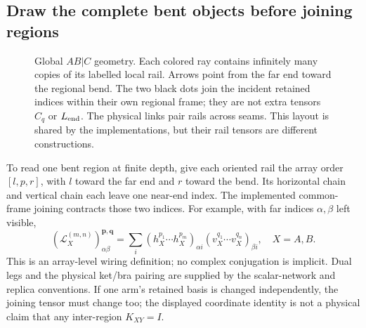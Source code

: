 \documentclass[11pt]{article}
\begin{document}
\subsection{Draw the complete bent objects before joining regions}
\begin{figure}[htbp]\centering
{}
\caption{Global $AB|C$ geometry. Each colored ray contains infinitely many
copies of its labelled local rail. Arrows point from the far end toward the
regional bend. The two black dots join the incident retained indices within
their own regional frame; they are not extra tensors $C_q$ or $L_{\rm end}$.
The physical links pair rails across seams. This layout is shared by the
implementations, but their rail tensors are different constructions.}
\end{figure}

To read one bent region at finite depth, give each oriented rail the array
order $[l,p,r]$, with $l$ toward the far end and $r$ toward the bend. Its
horizontal chain and vertical chain each leave one near-end index. The
implemented common-frame joining contracts those two indices. For example,
with far indices $\alpha,\beta$ left visible,
\begin{equation}\label{eq:bent-array}
 (\mathcal L_X^{(m,n)})_{\alpha\beta}^{\mathbf p,\mathbf q}
 =\sum_i(h_X^{p_1}\cdots h_X^{p_m})_{\alpha i}
         (v_X^{q_1}\cdots v_X^{q_n})_{\beta i},\quad X=A,B.
\end{equation}
This is an array-level wiring definition; no complex conjugation is implicit.
Dual legs and the physical ket/bra pairing are supplied by the scalar-network
and replica conventions. If one arm's retained basis is changed independently,
the joining tensor must change too; the displayed coordinate identity is not
a physical claim that any inter-region $K_{XY}=I$.
\end{document}
